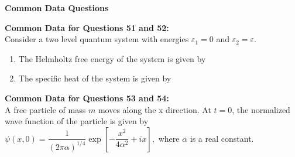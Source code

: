 \documentclass[14pt, a4paper]{extarticle}
\begin{document}
\vspace{1.5em}
\noindent
\textbf{Common Data Questions}
\vspace{1em}

\noindent
\textbf{Common Data for Questions 51 and 52:} \\
Consider a two level quantum system with energies $\varepsilon_1 = 0$ and $\varepsilon_2 = \varepsilon$.

\begin{enumerate}[label=\textbf{Q. \arabic*}, start=51]

\item The Helmholtz free energy of the system is given by
\begin{enumerate}[label=(\Alph*)]
\end{enumerate}

\item The specific heat of the system is given by
\begin{enumerate}[label=(\Alph*)]
\end{enumerate}

\end{enumerate}

\vspace{1.5em}
\noindent
\textbf{Common Data for Questions 53 and 54:} \\
A free particle of mass $m$ moves along the x direction.
At $t=0$, the normalized wave function of the particle is given by
$ \psi(x,0) = \dfrac{1}{(2\pi\alpha)^{1/4}}\exp\left[-\dfrac{x^2}{4\alpha^2} + ix\right], $
where $\alpha$ is a real constant.
\end{document}
